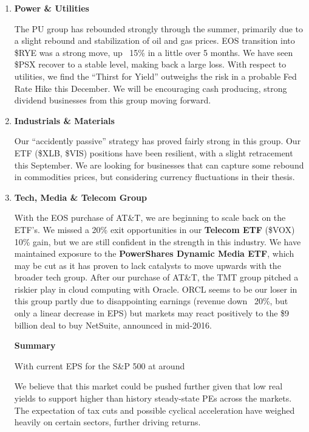 \documentclass[11pt,pressrelease]{newlfm} %
\begin{document}
\begin{newlfm}
\begin{singlespace}
\begin{enumerate}
\item \textbf{Power \& Utilities} \par
The PU group has rebounded strongly through the summer, primarily due to a slight rebound and stabilization of oil and gas prices. EOS transition into \$RYE was a strong move, up ~15\% in a little over 5 months. We have seen \$PSX recover to a stable level, making back a large loss.  With respect to utilities, we find the ``Thirst for Yield'' outweighs the risk in a probable Fed Rate Hike this December. We will be encouraging cash producing, strong dividend businesses from this group moving forward. 

\item \textbf{Industrials \& Materials} \par
Our ``accidently passive'' strategy has proved fairly strong in this group.  Our ETF (\$XLB, \$VIS) positions have been resilient, with a slight retracement this September. We are looking for businesses that can capture some rebound in commodities prices, but considering currency fluctuations in their thesis. 

\item  \textbf{Tech, Media \& Telecom Group} \par
With the EOS purchase of AT\&T, we are beginning to scale back on the ETF's. We missed a 20\% exit opportunities in our \textbf{Telecom ETF} (\$VOX) 10\% gain, but we are still confident in the strength in this industry. We have maintained exposure to the \textbf{PowerShares Dynamic Media ETF}, which may be cut as it has proven to lack catalysts to move upwards with the broader tech group. After our purchase of AT\&T, the TMT group pitched a riskier play in cloud computing with Oracle. ORCL seems to be our loser in this group partly due to disappointing earnings (revenue down ~20\%, but only a linear decrease in EPS) but markets may react positively to the \$9 billion deal to buy NetSuite, announced in mid-2016.\par


\center \textbf{Summary} \par
\raggedright
With current EPS for the S\&P 500 at around

We believe that this market could be pushed further given that low real yields to support higher than history steady-state PEs across the markets. The expectation of tax cuts and possible cyclical acceleration have weighed heavily on certain sectors, further driving returns.


\end{enumerate}
\end{singlespace}
\end{newlfm}
\end{document}

